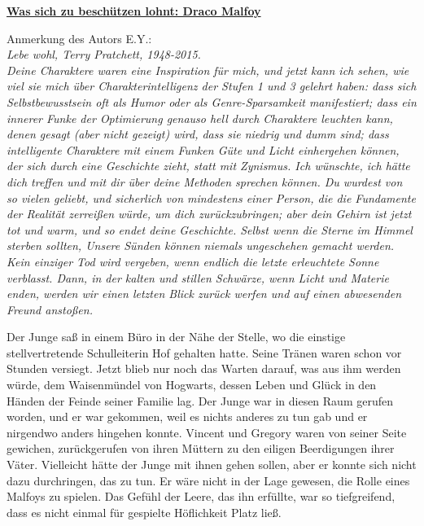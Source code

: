 

\hypertarget{was-sich-zu-beschuxfctzen-lohnt-draco-malfoy}{%

\textbf{\uline{Was sich zu beschützen lohnt: Draco Malfoy}}

Anmerkung des Autors E.Y.:\\ \emph{Lebe wohl, Terry Pratchett, 1948-2015.}\\ \emph{Deine Charaktere waren eine Inspiration für mich, und jetzt kann ich sehen, wie viel sie mich über Charakterintelligenz der Stufen 1 und 3 gelehrt haben: dass sich Selbstbewusstsein oft als Humor oder als Genre-Sparsamkeit manifestiert; dass ein innerer Funke der Optimierung genauso hell durch Charaktere leuchten kann, denen gesagt (aber nicht gezeigt) wird, dass sie niedrig und dumm sind; dass intelligente Charaktere mit einem Funken Güte und Licht einhergehen können, der sich durch eine Geschichte zieht, statt mit Zynismus. Ich wünschte, ich hätte dich treffen und mit dir über deine Methoden sprechen können. Du wurdest von so vielen geliebt, und sicherlich von mindestens einer Person, die die Fundamente der Realität zerreißen würde, um dich zurückzubringen; aber dein Gehirn ist jetzt tot und warm, und so endet deine Geschichte. Selbst wenn die Sterne im Himmel sterben sollten, Unsere Sünden können niemals ungeschehen gemacht werden. Kein einziger Tod wird vergeben, wenn endlich die letzte erleuchtete Sonne verblasst. Dann, in der kalten und stillen Schwärze, wenn Licht und Materie enden, werden wir einen letzten Blick zurück werfen und auf einen abwesenden Freund anstoßen.}

Der Junge saß in einem Büro in der Nähe der Stelle, wo die einstige stellvertretende Schulleiterin Hof gehalten hatte. Seine Tränen waren schon vor Stunden versiegt. Jetzt blieb nur noch das Warten darauf, was aus ihm werden würde, dem Waisenmündel von Hogwarts, dessen Leben und Glück in den Händen der Feinde seiner Familie lag. Der Junge war in diesen Raum gerufen worden, und er war gekommen, weil es nichts anderes zu tun gab und er nirgendwo anders hingehen konnte. Vincent und Gregory waren von seiner Seite gewichen, zurückgerufen von ihren Müttern zu den eiligen Beerdigungen ihrer Väter. Vielleicht hätte der Junge mit ihnen gehen sollen, aber er konnte sich nicht dazu durchringen, das zu tun. Er wäre nicht in der Lage gewesen, die Rolle eines Malfoys zu spielen. Das Gefühl der Leere, das ihn erfüllte, war so tiefgreifend, dass es nicht einmal für gespielte Höflichkeit Platz ließ.

}
